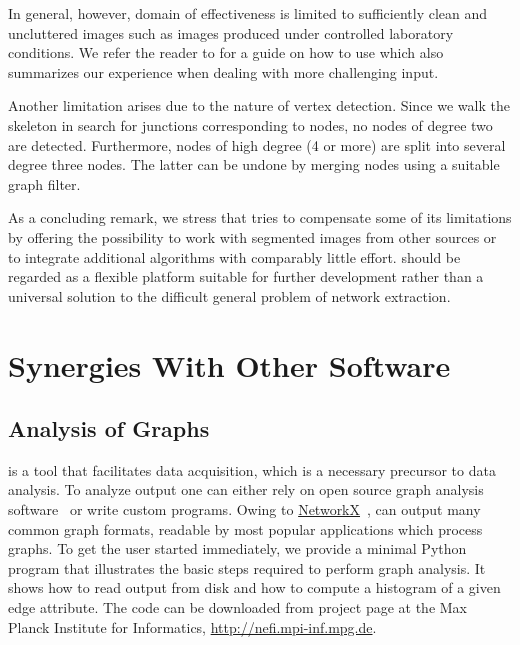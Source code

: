 		In general, however, \NEFIs domain of effectiveness is limited to sufficiently clean and uncluttered images such as images produced under controlled laboratory conditions. We refer the reader to  for a guide on how to use \NEFI which also summarizes our experience when dealing with more challenging input.

		Another limitation arises due to the nature of \NEFIs vertex detection. Since we walk the skeleton in search for junctions corresponding to nodes, no nodes of degree two are detected. Furthermore, nodes of high degree (4 or more) are split into several degree three nodes. The latter can be undone by merging nodes using a suitable graph filter.

		As a concluding remark, we stress that \NEFI tries to compensate some of its limitations by offering the possibility to work with segmented images from other sources or to integrate additional algorithms with comparably little effort. \NEFI should be regarded as a flexible platform suitable for further development rather than a universal solution to the difficult general problem of network extraction. 

\section{Synergies With Other Software}

	\subsection{Analysis of Graphs}

		\NEFI is a tool that facilitates data acquisition, which is a necessary precursor to data analysis. To analyze \NEFIs output one can either rely on open source graph analysis software~\cite{ICWSM09154,snap,batagelj1998pajek,5437689,loscalzo2008social,hagberg2008exploring} or write custom programs. Owing to \href{https://networkx.github.io/documentation/latest/index.html}{NetworkX}~\cite{networkx}, \NEFI can output many common graph formats, readable by most popular applications which process graphs. To get the user started immediately, we provide a minimal Python program that illustrates the basic steps required to perform graph analysis. It shows how to read \NEFIs output from disk and how to compute a histogram of a given edge attribute. The code can be downloaded from \NEFIs project page at the Max Planck Institute for Informatics, \href{http://nefi.mpi-inf.mpg.de}{http://nefi.mpi-inf.mpg.de}.

